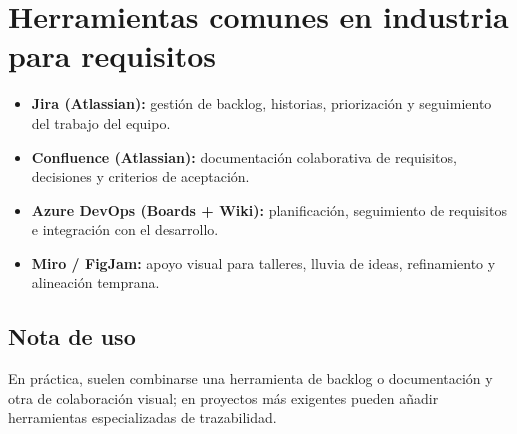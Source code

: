 \section{Herramientas comunes en industria para requisitos}
\begin{itemize}[leftmargin=1.2em]
  \item \textbf{Jira (Atlassian):} gesti\'on de backlog, historias, priorizaci\'on y seguimiento del trabajo del equipo.
  \item \textbf{Confluence (Atlassian):} documentaci\'on colaborativa de requisitos, decisiones y criterios de aceptaci\'on.
  \item \textbf{Azure DevOps (Boards + Wiki):} planificaci\'on, seguimiento de requisitos e integraci\'on con el desarrollo.
  \item \textbf{Miro / FigJam:} apoyo visual para talleres, lluvia de ideas, refinamiento y alineaci\'on temprana.
\end{itemize}

\subsection*{Nota de uso}
En pr\'actica, suelen combinarse una herramienta de backlog o documentaci\'on y otra de colaboraci\'on visual; en proyectos m\'as exigentes pueden a\~nadir herramientas especializadas de trazabilidad.
